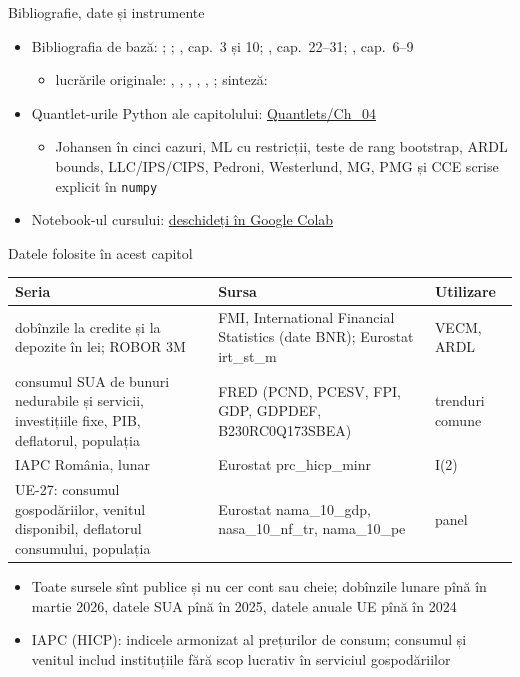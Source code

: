 \begin{frame}{Bibliografie, date și instrumente}
\itemsize{\small}
\begin{itemize}
    \item Bibliografia de bază: ; ; , cap.~3 și 10; , cap.~22--31; , cap.~6--9
    \begin{itemize}
        \item lucrările originale: , , , , , ; sinteză: 
    \end{itemize}
    \item Quantlet-urile Python ale capitolului: \href{https://github.com/danpele/Advanced-Time-Series/tree/main/Quantlets/Ch_04}{Quantlets/Ch\_04}
    \begin{itemize}
        \item Johansen în cinci cazuri, ML cu restricții, teste de rang bootstrap, ARDL bounds, LLC/IPS/CIPS, Pedroni, Westerlund, MG, PMG și CCE scrise explicit în \texttt{numpy}
    \end{itemize}
    \item Notebook-ul cursului: \href{\colaburl{notebooks/EN/chapter4_lecture_notebook.ipynb}}{deschideți în Google Colab}
\end{itemize}
\end{frame}

\begin{frame}{Datele folosite în acest capitol}
\itemsize{\footnotesize}
\begin{center}
\scriptsize
\begin{tabular}{>{\raggedright\arraybackslash}p{4.9cm}>{\raggedright\arraybackslash}p{4.6cm}>{\raggedright\arraybackslash}p{2.4cm}}
\toprule
\textbf{Seria} & \textbf{Sursa} & \textbf{Utilizare} \\
\midrule
dobînzile la credite și la depozite în lei; ROBOR 3M & FMI, International Financial Statistics (date BNR); Eurostat irt\_st\_m & VECM, ARDL \\
consumul SUA de bunuri nedurabile și servicii, investițiile fixe, PIB, deflatorul, populația & FRED (PCND, PCESV, FPI, GDP, GDPDEF, B230RC0Q173SBEA) & trenduri comune \\
IAPC România, lunar & Eurostat prc\_hicp\_minr & I(2) \\
UE-27: consumul gospodăriilor, venitul disponibil, deflatorul consumului, populația & Eurostat nama\_10\_gdp, nasa\_10\_nf\_tr, nama\_10\_pe & panel \\
\bottomrule
\end{tabular}
\end{center}
\begin{itemize}
    \item Toate sursele sînt publice și nu cer cont sau cheie; dobînzile lunare pînă în martie 2026, datele SUA pînă în 2025, datele anuale UE pînă în 2024
    \item IAPC (HICP): indicele armonizat al prețurilor de consum; consumul și venitul includ instituțiile fără scop lucrativ în serviciul gospodăriilor
\end{itemize}
\end{frame}

